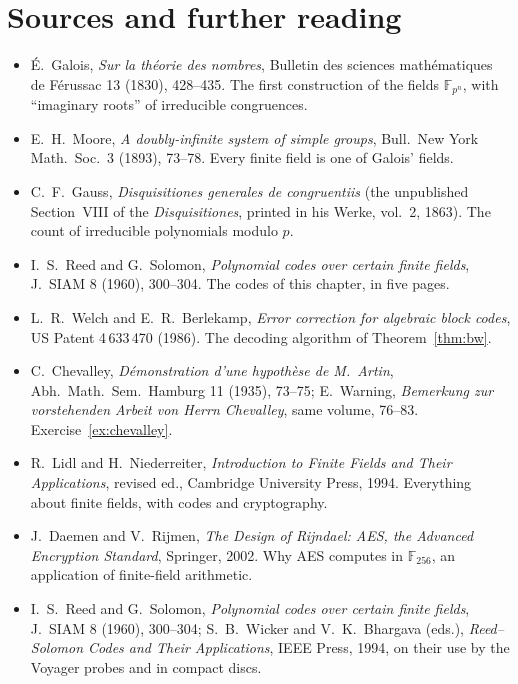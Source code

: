 \section*{Sources and further reading}

\begin{itemize}
\item \'E.~Galois, \emph{Sur la théorie des nombres}, Bulletin des sciences mathématiques de Férussac 13 (1830), 428--435. The first construction of the fields $\mathbb F_{p^n}$, with ``imaginary roots'' of irreducible congruences.
\item E.~H.~Moore, \emph{A doubly-infinite system of simple groups}, Bull.\ New York Math.\ Soc.\ 3 (1893), 73--78. Every finite field is one of Galois' fields.
\item C.~F.~Gauss, \emph{Disquisitiones generales de congruentiis} (the unpublished Section~VIII of the \emph{Disquisitiones}, printed in his Werke, vol.~2, 1863). The count of irreducible polynomials modulo $p$.
\item I.~S.~Reed and G.~Solomon, \emph{Polynomial codes over certain finite fields}, J.\ SIAM 8 (1960), 300--304. The codes of this chapter, in five pages.
\item L.~R.~Welch and E.~R.~Berlekamp, \emph{Error correction for algebraic block codes}, US Patent 4\,633\,470 (1986). The decoding algorithm of Theorem~\ref{thm:bw}.
\item C.~Chevalley, \emph{Démonstration d'une hypothèse de M.~Artin}, Abh.\ Math.\ Sem.\ Hamburg 11 (1935), 73--75; E.~Warning, \emph{Bemerkung zur vorstehenden Arbeit von Herrn Chevalley}, same volume, 76--83. Exercise~\ref{ex:chevalley}.
\item R.~Lidl and H.~Niederreiter, \emph{Introduction to Finite Fields and Their Applications}, revised ed., Cambridge University Press, 1994. Everything about finite fields, with codes and cryptography.
\item J.~Daemen and V.~Rijmen, \emph{The Design of Rijndael: AES, the Advanced Encryption Standard}, Springer, 2002. Why AES computes in $\mathbb F_{256}$, an application of finite-field arithmetic.
\item I.~S.~Reed and G.~Solomon, \emph{Polynomial codes over certain finite fields}, J.\ SIAM 8 (1960), 300--304; S.~B.~Wicker and V.~K.~Bhargava (eds.), \emph{Reed--Solomon Codes and Their Applications}, IEEE Press, 1994, on their use by the Voyager probes and in compact discs.
\end{itemize}

